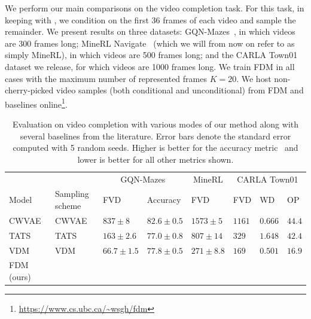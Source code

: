 We perform our main comparisons on the video completion task. For this task, in keeping with \citet{saxena2021clockwork}, we condition on the first 36 frames of each video and sample the remainder. We present results on three datasets: GQN-Mazes~\citep{eslami2018neural}, in which videos are 300 frames long; MineRL Navigate~\citep{guss2019minerl,saxena2021clockwork} (which we will from now on refer to as simply MineRL), in which videos are 500 frames long; and the CARLA Town01 dataset we release, for which videos are 1000 frames long. We train FDM in all cases with the maximum number of represented frames $K=20$. We host non-cherry-picked video samples (both conditional and unconditional) from FDM and baselines online\footnote{\url{https://www.cs.ubc.ca/~wsgh/fdm}}.


\begin{table}
  \scriptsize
  \caption{Evaluation on video completion with various modes of our method along with several baselines from the literature. Error bars denote the standard error computed with 5 random seeds. Higher is better for the accuracy metric~\cite{saxena2021clockwork} and lower is better for all other metrics shown.}
  \label{tab:fdm-results-completion}
  \centering
  \begin{tabular}{llllllll}
    \toprule
    \multicolumn{1}{r}{} & & \multicolumn{2}{c}{GQN-Mazes}  & \multicolumn{1}{c}{MineRL}  & \multicolumn{3}{c}{CARLA Town01} \\
    \cmidrule(r){3-4} \cmidrule(r){5-5} \cmidrule(r){6-8}
    Model &  Sampling scheme        & FVD      & Accuracy  & FVD     &  FVD     & WD  & OP \\
    \midrule
    \multirow{1}{*}{CWVAE~\citep{saxena2021clockwork}}
    & CWVAE  & $837 \pm 8$      & $82.6 \pm 0.5$  & $1573 \pm 5$                 & $1161$          & $0.666$   & $44.4$        \\
    \midrule
    \multirow{1}{*}{TATS~\citep{ge2022long}}
    & TATS   & $163 \pm 2.6$  &  $77.0 \pm 0.8$  & $807 \pm 14$          & $329$          & $1.648$          & $42.4$ \\
    \midrule
    \multirow{1}{*}{VDM~\citep{ho2022video}}
    & VDM   & $66.7 \pm 1.5$  &  $77.8 \pm 0.5$  & $271 \pm 8.8$          & $169$          & $0.501$          & $16.9$ \\
    \midrule
    \multirow{5}{*}{FDM (ours)}

\end{tabular}
\end{table}
